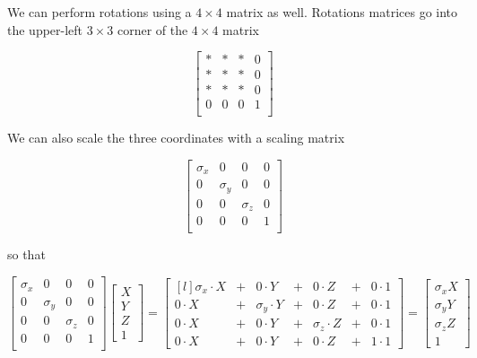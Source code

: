 \documentclass{article}
\theoremstyle{definition}
\begin{document}
\bigskip
\noindent
We can perform rotations using a $4 \times 4$ matrix as well. Rotations matrices go into the upper-left
$3 \times 3$ corner of the $4 \times 4$ matrix

\begin{equation*}
\begin{bmatrix}  * & * & * & 0 \\ 
                          * & * & *  & 0 \\ 
                          * & * & * & 0 \\
                          0 & 0 & 0 & 1     \\
\end{bmatrix} 
\end{equation*}

\bigskip
\noindent
We can also scale the three coordinates with a scaling matrix


\begin{equation*}
\begin{bmatrix}  \sigma_x & 0 & 0 & 0 \\ 
                          0 & \sigma_y& 0 & 0 \\ 
                          0 & 0 & \sigma_z & 0 \\
                          0 & 0 & 0 & 1     \\
\end{bmatrix} 
\end{equation*}

\bigskip
\noindent
so that 

\begin{equation*}
\begin{bmatrix}  \sigma_x & 0 & 0 & 0 \\ 
                          0 & \sigma_y& 0 & 0 \\ 
                          0 & 0 & \sigma_z & 0 \\
                          0 & 0 & 0 & 1     \\
\end{bmatrix} 
\begin{bmatrix} X \\ Y \\ Z \\ 1 \end{bmatrix} =
\begin{bmatrix*}[l]
\sigma_x  \cdot X  &+&  0             \cdot Y    &+& 0 \cdot Z                &+& 0 \cdot 1 \\
0 \cdot X               &+&  \sigma_y \cdot Y    &+& 0 \cdot Z                &+& 0 \cdot 1 \\
0 \cdot X               &+& 0               \cdot Y    &+& \sigma_z \cdot Z   &+& 0 \cdot 1 \\
0 \cdot X              &+& 0                \cdot Y    &+& 0 \cdot Z               &+& 1 \cdot 1
\end{bmatrix*} =
\begin{bmatrix} \sigma_x X \\ \sigma_y Y \\ \sigma_z Z \\ 1 \end{bmatrix} 
\end{equation*}
\end{document}
